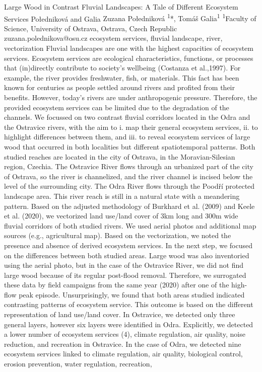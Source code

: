 \abstract
{Large Wood in Contrast Fluvial Landscapes: A Tale of Different Ecosystem Services} 
{Połedniková and Galia} 
{Zuzana Połedniková \textsuperscript{1}*, Tomáš Galia\textsuperscript{1}} 
{\TLtag} 
{
\textsuperscript{1}Faculty of Science, University of Ostrava, Ostrava, Czech Republic
}
{zuzana.polednikova@osu.cz}  %
{ecosystem services, fluvial landscape, river, vectorization}
{
Fluvial landscapes are one with the highest capacities of ecosystem services. Ecosystem services are ecological characteristics, functions, or processes that (in)directly contribute to society's wellbeing (Costanza et al.,1997). For example, the river provides freshwater, fish, or materials. This fact has been known for centuries as people settled around rivers and profited from their benefits. However, today’s rivers are under anthropogenic pressure. Therefore, the provided ecosystem services can be limited due to the degradation of the channels. We focussed on two contrast fluvial corridors located in the Odra and the Ostravice rivers, with the aim to i. map their general ecosystem services, ii. to highlight differences between them, and iii. to reveal ecosystem services of large wood that occurred in both localities but different spatiotemporal patterns. Both studied reaches are located in the city of Ostrava, in the Moravian-Silesian region, Czechia. The Ostravice River flows through an urbanized part of the city of Ostrava, so the river is channelized, and the river channel is incised below the level of the surrounding city. The Odra River flows through the Poodří protected landscape area. This river reach is still in a natural state with a meandering pattern. Based on the adjusted methodology of Burkhard et al. (2009) and Keele et al. (2020), we vectorized land use/land cover of 3km long and 300m wide fluvial corridors of both studied rivers.  We used aerial photos and additional map sources (e.g., agricultural map). Based on the vectorization, we noted the presence and absence of derived ecosystem services. In the next step, we focused on the differences between both studied areas. Large wood was also inventoried using the aerial photo, but in the case of the Ostravice River, we did not find large wood because of its regular post-flood removal. Therefore, we surrogated these data by field campaigns from the same year (2020) after one of the high-flow peak episode. Unsurprisingly, we found that both areas studied indicated contrasting patterns of ecosystem service. This outcome is based on the different representation of land use/land cover. In Ostravice, we detected only three general layers, however six layers were identified in Odra. Explicitly, we detected a lower number of ecosystem services (4), climate regulation, air quality, noise reduction, and recreation in Ostravice. In the case of Odra, we detected nine ecosystem services linked to climate regulation, air quality, biological control, erosion prevention, water regulation, recreation, }
